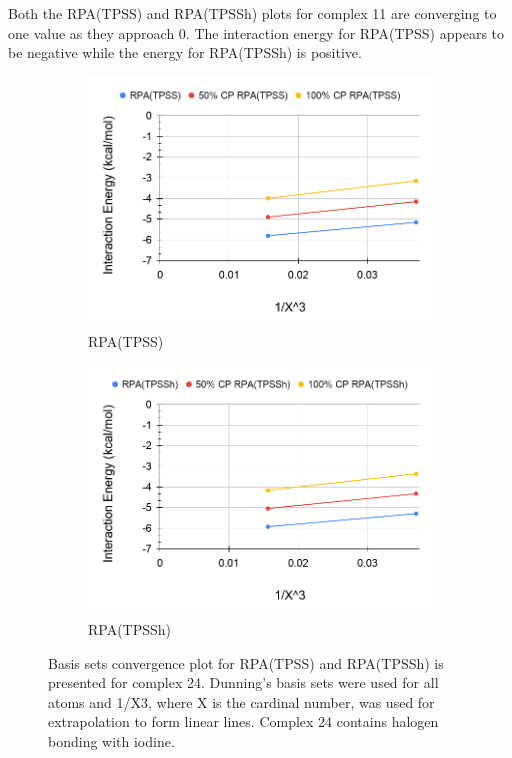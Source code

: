 \documentclass[11pt]{article}
\begin{document}
Both the RPA(TPSS) and RPA(TPSSh) plots for complex 11 are converging
to one value as they approach 0. The interaction energy for RPA(TPSS)
appears to be negative while the energy for RPA(TPSSh) is positive.


\begin{figure}[H]
  \centering
  \begin{subfigure}{.5\textwidth}
    \centering
    \includegraphics[scale=0.3]{tpss-24.png}
    \caption{RPA(TPSS)}
    \label{fig:tpss_24}
  \end{subfigure}%
  \begin{subfigure}{.5\textwidth}
    \centering
    \includegraphics[scale=0.3]{tpssh-24.png}
    \caption{RPA(TPSSh)}
    \label{fig:tpssh_24}
  \end{subfigure}
  \caption{Basis sets convergence plot for RPA(TPSS) and RPA(TPSSh) is
    presented for complex 24. Dunning's basis sets were used for all
    atoms and 1/X3, where X is the cardinal number, was used for
    extrapolation to form linear lines. Complex 24 contains halogen 
    bonding with iodine.}
  \label{fig:complex_24}
\end{figure}
\end{document}
